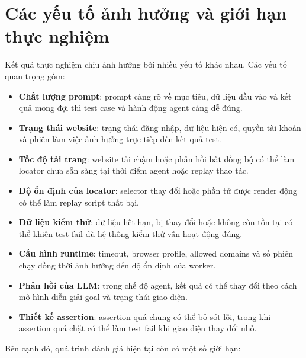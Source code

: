 \section{Các yếu tố ảnh hưởng và giới hạn thực nghiệm}

Kết quả thực nghiệm chịu ảnh hưởng bởi nhiều yếu tố khác nhau. Các yếu tố quan trọng gồm:

\begin{itemize}
    \item \textbf{Chất lượng prompt}: prompt càng rõ về mục tiêu, dữ liệu đầu vào và kết quả mong đợi thì test case và hành động agent càng dễ đúng.
    \item \textbf{Trạng thái website}: trạng thái đăng nhập, dữ liệu hiện có, quyền tài khoản và phiên làm việc ảnh hưởng trực tiếp đến kết quả test.
    \item \textbf{Tốc độ tải trang}: website tải chậm hoặc phản hồi bất đồng bộ có thể làm locator chưa sẵn sàng tại thời điểm agent hoặc replay thao tác.
    \item \textbf{Độ ổn định của locator}: selector thay đổi hoặc phần tử được render động có thể làm replay script thất bại.
    \item \textbf{Dữ liệu kiểm thử}: dữ liệu hết hạn, bị thay đổi hoặc không còn tồn tại có thể khiến test fail dù hệ thống kiểm thử vẫn hoạt động đúng.
    \item \textbf{Cấu hình runtime}: timeout, browser profile, allowed domains và số phiên chạy đồng thời ảnh hưởng đến độ ổn định của worker.
    \item \textbf{Phản hồi của LLM}: trong chế độ agent, kết quả có thể thay đổi theo cách mô hình diễn giải goal và trạng thái giao diện.
    \item \textbf{Thiết kế assertion}: assertion quá chung có thể bỏ sót lỗi, trong khi assertion quá chặt có thể làm test fail khi giao diện thay đổi nhỏ.
\end{itemize}

Bên cạnh đó, quá trình đánh giá hiện tại còn có một số giới hạn:

